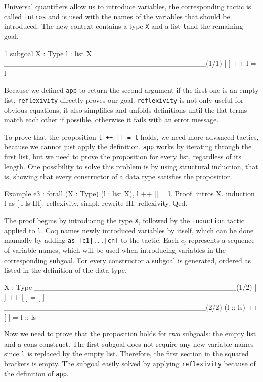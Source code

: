 \documentclass[paper = a4, fleqn, twoside]{scrreprt}
\newcommand{\coqinline}[1]{\texttt{#1}}
\begin{document}
Universal quantifiers allow us to introduce variables, the corresponding tactic is called \coqinline{intros} and is used with the names of the variables that should be introduced. The new context contains a type \coqinline{X} and a list \coqinline{l}and the remaining goal.
\begin{coqcode}
1 subgoal
X : Type
l : list X
______________________________________(1/1)
[ ] ++ l = l
\end{coqcode}
Because we defined \coqinline{app} to return the second argument if the first one is an empty list, \coqinline{reflexivity} directly proves our goal. \coqinline{reflexivity} is not only useful for obvious equations, it also simplifies and unfolds definitions until the flat terms match each other if possible, otherwise it fails with an error message.
\par
To prove that the proposition \coqinline{l ++ [] = l} holds, we need more advanced tactics, because we cannot just apply the definition. \coqinline{app} works by iterating through the first list, but we need to prove the proposition for every list, regardless of its length. One possibility to solve this problem is by using structural induction, that is, showing that every constructor of a data type satisfies the proposition.
\newpage
\begin{coqcode}
Example e3 : forall (X : Type) (l : list X), l ++ [] = l.
Proof. intros X. induction l as [|l ls IH].
  reflexivity.
  simpl. rewrite IH. reflexivity.
Qed.
\end{coqcode}
The proof begins by introducing the type \coqinline{X}, followed by the \coqinline{induction} tactic applied to \coqinline{l}. Coq names newly introduced variables by itself, which can be done manually by adding \coqinline{as [c1|...|cn]} to the tactic. Each $c_{i}$ represents a sequence of variable names, which will be used when introducing variables in the corresponding subgoal. For every constructor a subgoal is generated, ordered as listed in the definition of the data type.
\begin{coqcode}
X : Type
______________________________________(1/2)
[ ] ++ [ ] = [ ]
______________________________________(2/2)
(l :: ls) ++ [ ] = l :: ls
\end{coqcode}
Now we need to prove that the proposition holds for two subgoals: the empty list and a cons construct. The first subgoal does not require any new variable names since \coqinline{l} is replaced by the empty list. Therefore, the first section in the squared brackets is empty. The subgoal easily solved by applying \coqinline{reflexivity} because of the definition of \coqinline{app}.
\end{document}
